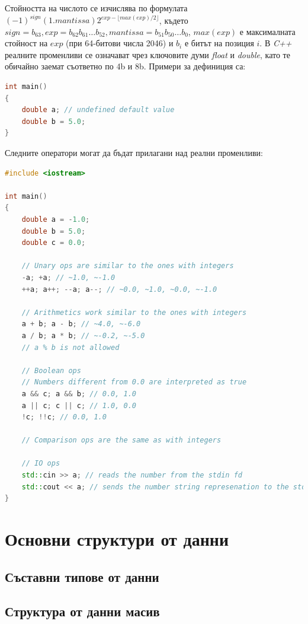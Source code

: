 \documentclass[fleqn,12pt]{article}
\begin{document}
\begin{flushleft}
Стойността на числото се изчислява по формулата $(-1)^{sign} (1.mantissa) 2^{exp - \lfloor max(exp)/2 \rfloor}$, където $sign = b_{63}, exp = b_{62}b_{61} \dots b_{52}, mantissa = b_{51}b_{50} \dots b_{0}$, $max(exp)$ е максималната стойност на $exp$ (при 64-битови числа 2046) и $b_i$ е битът на позиция $i$.
\bigbreak
В \textit{C++} реалните променливи се означават чрез ключовите думи \textit{float} и \textit{double}, като те обичайно заемат съответно по 4b и 8b. Примери за дефиниция са:

\begin{lstlisting}[language=C++, caption=Real numbers]
int main()
{
    double a; // undefined default value
    double b = 5.0;
}
\end{lstlisting}

Следните оператори могат да бъдат прилагани над реални променливи:

\begin{lstlisting}[language=C++, caption=Real number operations]
#include <iostream>

int main()
{
    double a = -1.0;
    double b = 5.0;
    double c = 0.0;

    // Unary ops are similar to the ones with integers
    -a; +a; // ~1.0, ~-1.0
    ++a; a++; --a; a--; // ~0.0, ~1.0, ~0.0, ~-1.0

    // Arithmetics work similar to the ones with integers
    a + b; a - b; // ~4.0, ~-6.0
    a / b; a * b; // ~-0.2, ~-5.0
    // a % b is not allowed

    // Boolean ops
    // Numbers different from 0.0 are interpreted as true
    a && c; a && b; // 0.0, 1.0
    a || c; c || c; // 1.0, 0.0
    !c; !!c; // 0.0, 1.0

    // Comparison ops are the same as with integers

    // IO ops
    std::cin >> a; // reads the number from the stdin fd
    std::cout << a; // sends the number string represenation to the stdout fd
}

\end{lstlisting}

\section{Основни структури от данни}
\subsection{Съставни типове от данни}
\subsection{Структура от данни масив}

\end{flushleft}
\end{document}
